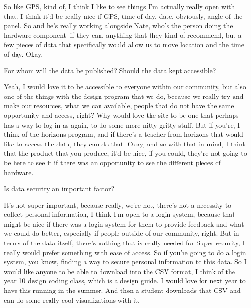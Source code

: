 \documentclass[titlepage]{article}
\begin{document}
So like GPS, kind of, I think I like to see things I'm actually really open with that. I think it'd be really nice if GPS, time of day, date, obviously, angle of the panel. So and he's really working alongside Nate, who's the person doing the hardware component, if they can, anything that they kind of recommend, but a few pieces of data that specifically would allow us to move location and the time of day. Okay.

\begin{center}
  \vspace*{3mm}
  \underline{For whom will the data be published? Should the data kept accessible?}
  \vspace*{1mm}
\end{center}

Yeah, I would love it to be accessible to everyone within our community, but also one of the things with the design program that we do, because we really try and make our resources, what we can available, people that do not have the same opportunity and access, right? Why would love the site to be one that perhaps has a way to log in as again, to do some more nitty gritty stuff. But if you're, I think of the horizons program, and if there's a teacher from horizons that would like to access the data, they can do that.
Okay, and so with that in mind, I think that the product that you produce, it'd be nice, if you could, they're not going to be here to see it if there was an opportunity to see the different pieces of hardware.

\begin{center}
  \vspace*{3mm}
  \underline{Is data security an important factor?}
  \vspace*{1mm}
\end{center}

It's not super important, because really, we're not, there's not a necessity to collect personal information, I think I'm open to a login system, because that might be nice if there was a login system for them to provide feedback and what we could do better, especially if people outside of our community, right. But in terms of the data itself, there's nothing that is really needed for Super security, I really would prefer something with ease of access. So if you're going to do a login system, you know, finding a way to secure personal information to this data. So I would like anyone to be able to download into the CSV format, I think of the year 10 design coding class, which is a design guide. I would love for next year to have this running in the summer. And then a student downloads that CSV and can do some really cool visualizations with it.
\end{document}
